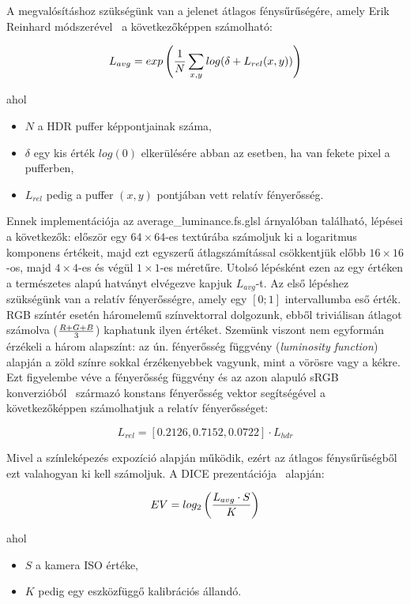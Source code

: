 A megvalósításhoz szükségünk van a jelenet átlagos fénysűrűségére, amely Erik Reinhard módszerével~\cite{reinhard2002photographic} a következőképpen számolható:

\[
L_{avg} = exp\left( { 1 \over N } \displaystyle\sum_{x, y} log(\delta + L_{rel}(x, y)) \right)
\]

ahol

\begin{itemize}[noitemsep]
\item \(N\) a HDR puffer képpontjainak száma,
\item \(\delta\) egy kis érték \(log(0)\) elkerülésére abban az esetben, ha van fekete pixel a pufferben,
\item \(L_{rel}\) pedig a puffer \((x, y)\) pontjában vett relatív fényerősség.
\end{itemize}

Ennek implementációja az average\_luminance.fs.glsl árnyalóban található, lépései a következők: először egy \(64 \times 64\)-es textúrába számoljuk ki a logaritmus komponens értékeit, majd ezt egyszerű átlagszámítással csökkentjük előbb \(16 \times 16\)-os, majd \(4 \times 4\)-es és végül \(1 \times 1\)-es méretűre. Utolsó lépésként ezen az egy értéken a természetes alapú hatványt elvégezve kapjuk \(L_{avg}\)-t. Az első lépéshez szükségünk van a relatív fényerősségre, amely egy \([0; 1]\) intervallumba eső érték. RGB színtér esetén háromelemű színvektorral dolgozunk, ebből triviálisan átlagot számolva (\( { R + G + B } \over 3 \)) kaphatunk ilyen értéket. Szemünk viszont nem egyformán érzékeli a három alapszínt: az ún. fényerősség függvény (\textit{luminosity function}) alapján a zöld színre sokkal érzékenyebbek vagyunk, mint a vörösre vagy a kékre. Ezt figyelembe véve a fényerősség függvény és az azon alapuló sRGB konverzióból~\cite{stokes2012standard} származó konstans fényerősség vektor segítségével a következőképpen számolhatjuk a relatív fényerősséget:

\[
L_{rel} = [0.2126, 0.7152, 0.0722] \cdot L_{hdr}
\]

Mivel a színleképezés expozíció alapján működik, ezért az átlagos fénysűrűségből ezt valahogyan ki kell számoljuk. A DICE prezentációja~\cite{dice_moving_frostbite_to_pbr} alapján:

\[
EV = log_2\left({ L_{avg} \cdot S } \over K\right)
\]

ahol

\begin{itemize}[noitemsep]
\item \(S\) a kamera ISO értéke,
\item \(K\) pedig egy eszközfüggő kalibrációs állandó.
\end{itemize}

